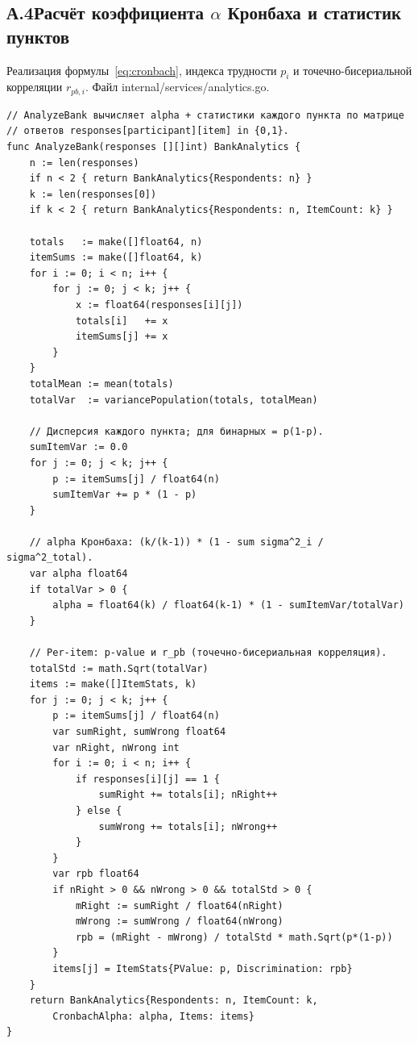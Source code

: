 \subsection*{А.4\quad Расчёт коэффициента $\alpha$ Кронбаха и статистик пунктов}

Реализация формулы~\eqref{eq:cronbach}, индекса трудности $p_i$
и точечно-бисериальной корреляции $r_{pb,i}$. Файл
internal/services/analytics.go.

\begin{lstlisting}[caption={Расчёт $\alpha$ Кронбаха и статистик пунктов},label=lst:analytics-go]
// AnalyzeBank вычисляет alpha + статистики каждого пункта по матрице
// ответов responses[participant][item] in {0,1}.
func AnalyzeBank(responses [][]int) BankAnalytics {
    n := len(responses)
    if n < 2 { return BankAnalytics{Respondents: n} }
    k := len(responses[0])
    if k < 2 { return BankAnalytics{Respondents: n, ItemCount: k} }

    totals   := make([]float64, n)
    itemSums := make([]float64, k)
    for i := 0; i < n; i++ {
        for j := 0; j < k; j++ {
            x := float64(responses[i][j])
            totals[i]   += x
            itemSums[j] += x
        }
    }
    totalMean := mean(totals)
    totalVar  := variancePopulation(totals, totalMean)

    // Дисперсия каждого пункта; для бинарных = p(1-p).
    sumItemVar := 0.0
    for j := 0; j < k; j++ {
        p := itemSums[j] / float64(n)
        sumItemVar += p * (1 - p)
    }

    // alpha Кронбаха: (k/(k-1)) * (1 - sum sigma^2_i / sigma^2_total).
    var alpha float64
    if totalVar > 0 {
        alpha = float64(k) / float64(k-1) * (1 - sumItemVar/totalVar)
    }

    // Per-item: p-value и r_pb (точечно-бисериальная корреляция).
    totalStd := math.Sqrt(totalVar)
    items := make([]ItemStats, k)
    for j := 0; j < k; j++ {
        p := itemSums[j] / float64(n)
        var sumRight, sumWrong float64
        var nRight, nWrong int
        for i := 0; i < n; i++ {
            if responses[i][j] == 1 {
                sumRight += totals[i]; nRight++
            } else {
                sumWrong += totals[i]; nWrong++
            }
        }
        var rpb float64
        if nRight > 0 && nWrong > 0 && totalStd > 0 {
            mRight := sumRight / float64(nRight)
            mWrong := sumWrong / float64(nWrong)
            rpb = (mRight - mWrong) / totalStd * math.Sqrt(p*(1-p))
        }
        items[j] = ItemStats{PValue: p, Discrimination: rpb}
    }
    return BankAnalytics{Respondents: n, ItemCount: k,
        CronbachAlpha: alpha, Items: items}
}
\end{lstlisting}


